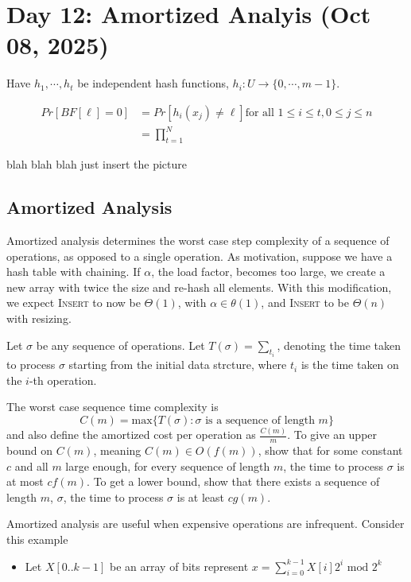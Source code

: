 \section{Day 12: Amortized Analyis (Oct 08, 2025)}

Have $h_1, \cdots, h_t$ be independent hash functions, $h_i : U \to \{ 0, \cdots, m - 1 \}$.

\begin{align*}
    Pr[BF[\ell] = 0] &= Pr[h_i(x_j) \ne \ell] \text{for all $1 \leq i \leq t, 0 \leq j \leq n$} \\
    &= \prod_{t=1}^{N} 
\end{align*}

blah blah blah just insert the picture

\subsection{Amortized Analysis}

Amortized analysis determines the worst case step complexity of a sequence of operations, as opposed to a single operation. As motivation, suppose we have a hash table with chaining. If $\alpha$, the load factor, becomes too large, we create a new array with twice the size and re-hash all elements. With this modification, we expect \textsc{Insert} to now be $\Theta(1)$, with $\alpha \in \theta(1)$, and \textsc{Insert} to be $\Theta(n)$ with resizing. 

Let $\sigma$ be any sequence of operations. Let $T(\sigma) = \sum_t_i$, denoting the time taken to process $\sigma$ starting from the initial data strcture, where $t_i$ is the time taken on the $i$-th operation. 

The worst case sequence time complexity is
\[
C(m) = \text{max}\{ T(\sigma) : \text{$\sigma$ is a sequence of length $m$} \}
\]
and also define the amortized cost per operation as $\frac{C(m)}{m}$. To give an upper bound on $C(m)$, meaning $C(m) \in O(f(m))$, show that for some constant $c$ and all $m$ large enough, for every sequence of length $m$, the time to process $\sigma$ is at most $cf(m)$. To get a lower bound, show that there exists a sequence of length $m$, $\sigma$, the time to process $\sigma$ is at least $cg(m)$.

Amortized analysis are useful when expensive operations are infrequent. Consider this example
\begin{itemize}
    \item Let $X[0..k-1]$ be an array of bits represent $x = \sum_{i=0}^{k-1} X[i]2^i \text{ mod } 2^k$ 
\end{itemize}

